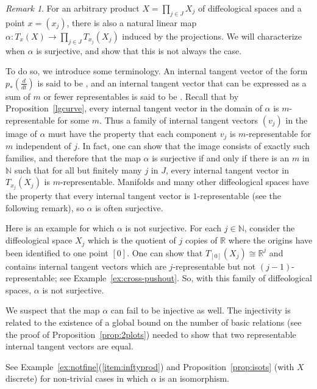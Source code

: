 \documentclass{amsart}
\newcommand{\dfn}[1]{\textbf{\boldmath{#1}}}
\theoremstyle{remark}
\newtheorem{rem}[de]{Remark}
\newcommand{\ra}{\to}
\newcommand{\ddt}{{\textstyle\frac{d}{dt}}}
\def \N{\mathbb{N}}
\def \R{\mathbb{R}}
\begin{document}
\begin{rem}\label{rem:infinite-product}
For an arbitrary product $X = \prod_{j \in J} X_j$ of diffeological spaces
and a point $x = (x_j)$,
there is also a natural linear map $\alpha: T_x(X) \ra \prod_{j \in J} T_{x_j}(X_j)$
induced by the projections.
We will characterize when $\alpha$ is surjective, and show that this
is not always the case.

To do so, we introduce some terminology.
An internal tangent vector of the form $p_*(\ddt)$ is said to be \dfn{representable},
and an internal tangent vector that can be expressed as a sum of $m$ or fewer
representables is said to be \dfn{$m$-representable}.
Recall that by Proposition~\ref{lgcurve},
every internal tangent vector in the domain of $\alpha$ is $m$-representable for some $m$.
Thus a family of internal tangent vectors $(v_j)$ in the image of $\alpha$ must have the property that each
component $v_j$ is $m$-representable for $m$ independent of $j$.
In fact, one can show that the image consists of exactly such families,
and therefore that the map $\alpha$ is surjective if and only if
there is an $m$ in $\N$ such that for all but finitely many $j$ in $J$,
every internal tangent vector in $T_{x_j}(X_j)$ is $m$-representable.
Manifolds and many other diffeological spaces have the property that
every internal tangent vector is $1$-representable (see the following remark),
so $\alpha$ is often surjective.

Here is an example for which $\alpha$ is not surjective.
For each $j \in \N$, consider the diffeological space $X_j$ which is
the quotient of $j$ copies of $\R$ where the origins have been identified
to one point $[0]$.  One can show that $T_{[0]}(X_j) \cong \R^{j}$ and contains internal tangent
vectors which are $j$-representable but not $(j-1)$-representable; see Example~\ref{ex:cross-pushout}.
So, with this family of diffeological spaces, $\alpha$ is not surjective.

We suspect that the map $\alpha$ can fail to be injective as well.  The injectivity
is related to the existence of a global bound on the number of basic relations
(see the proof of Proposition~\ref{prop:2plots}) needed to show that
two representable internal tangent vectors are equal.
%

See Example~\ref{ex:notfine}(\ref{item:inftyprod}) and Proposition~\ref{prop:isots} (with $X$ discrete)
for non-trivial cases in which $\alpha$ is an isomorphism.
\end{rem}
\end{document}
